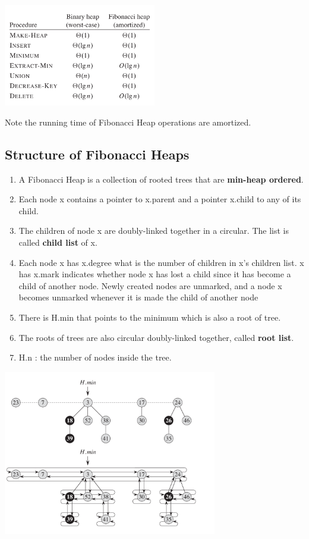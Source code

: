     \includegraphics[width=0.5\textwidth]{contents/Advanced_Data_Structure/Fibonacci_Heap/fh_images/Screenshot from 2021-06-15 02-27-44.png}

    Note the running time of Fibonacci Heap operations are amortized.

\subsection{Structure of Fibonacci Heaps}

    \begin{enumerate}
        \item A Fibonacci Heap is a collection of rooted trees that are 
        \textbf{min-heap ordered}.
        \item Each node x contains a pointer to x.parent and a pointer x.child to
        any of its child.
        \item The children of node x are doubly-linked together in a circular. 
        The list is called \textbf{child list} of x.
        \item Each node x has x.degree what is the number of children in x's children
        list. x has x.mark indicates whether node x has lost a child since it has 
        become a child of another node. Newly created nodes are unmarked, and a node x becomes unmarked whenever it
        is made the child of another node
        \item There is H.min that points to the minimum which is also a root of tree.
        \item The roots of trees are also circular doubly-linked together, called 
        \textbf{root list}.
        \item H.n : the number of nodes inside the tree.
    \end{enumerate}

    \includegraphics[width=0.7\textwidth]{contents/Advanced_Data_Structure/Fibonacci_Heap/fh_images/fb_heap_structure.png}

